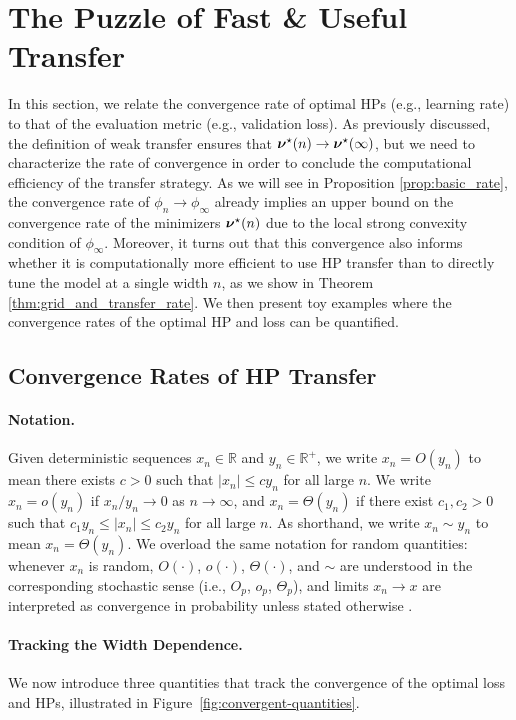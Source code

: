 \section{The Puzzle of Fast \& Useful Transfer}\label{sec:useful-transfer}
 
In this section, we relate the convergence rate of optimal HPs (e.g., learning rate) to that of the evaluation metric (e.g., validation loss). 
As previously discussed, the definition of weak transfer ensures that $\bm{\nu}^\star(n) \to \bm{\nu}^\star(\infty)$, but we need to characterize the rate of convergence in order to conclude the computational efficiency of the transfer strategy. As we will see in Proposition \ref{prop:basic_rate}, the convergence rate of $\phi_n \to \phi_\infty$ already implies an upper bound on the convergence rate of the minimizers $\bm{\nu}^\star(n)$ due to the local strong convexity condition of $\phi_\infty$. Moreover, it turns out that this convergence also informs whether it is computationally more efficient to use HP transfer than to directly tune the model at a single width $n$, as we show in Theorem \ref{thm:grid_and_transfer_rate}. We then present toy examples where the convergence rates of the optimal HP and loss can be quantified. 

\subsection{Convergence Rates of HP Transfer}\label{sec:hp-asymptotics}

\paragraph{Notation.}
Given deterministic sequences $x_n \in \mathbb{R}$ and $y_n \in \mathbb{R}^+$, we write $x_n = O(y_n)$ to mean there exists $c > 0$ such that $|x_n| \leq c y_n$ for all large $n$. We write $x_n = o(y_n)$ if $x_n / y_n \to 0$ as $n \to \infty$, and $x_n = \Theta(y_n)$ if there exist $c_1, c_2 > 0$ such that $c_1 y_n \leq |x_n| \leq c_2 y_n$ for all large $n$. As shorthand, we write $x_n \sim y_n$ to mean $x_n = \Theta(y_n)$. We overload the same notation for random quantities: whenever $x_n$ is random, $O(\cdot)$, $o(\cdot)$, $\Theta(\cdot)$, and $\sim$ are understood in the corresponding stochastic sense (i.e., $O_p$, $o_p$, $\Theta_p$), and limits $x_n \to x$ are interpreted as convergence in probability unless stated otherwise \citep[Section~2.2]{vandervaart1998asymptotic}.


\paragraph{Tracking the Width Dependence.}
We now introduce three quantities that track the convergence of the optimal loss and HPs, illustrated in Figure~\ref{fig:convergent-quantities}.

